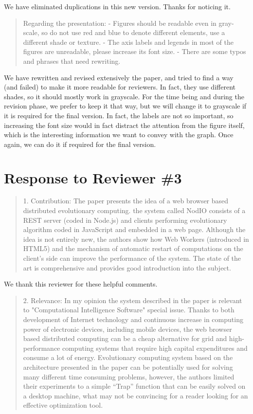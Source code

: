 \documentclass[preprint]{elsarticle}
\begin{document}
We have eliminated duplications in this new version. Thanks for
noticing it.

\begin{quote}
Regarding the presentation:
-  Figures should be readable even in gray-scale, so do not use red and blue to denote different
elements, use a different shade or texture.
-  The axis labels and legends in most of the figures are unreadable, please increase its font size.
-  There are some typos and phrases that need rewriting.
\end{quote}

We have rewritten and revised extensively the paper, and tried to find
a way (and failed) to make it more readable for reviewers. In fact,
they use different shades, so it should mostly work in grayscale. For
the time being and 
during the revision phase, we prefer to keep it that way, but we will
change it to grayscale if it is required for the final version. 
In fact, the labels are not so important, so increasing the font size
would in fact distract the attention from the figure itself, which is
the interesting information we want to convey with the graph. Once
again, we can do it if required for the final version.

\section{Response to Reviewer \#3}

\begin{quote}
1. Contribution: The paper presents the idea of a web browser based distributed evolutionary computing.
the system called NodIO consists of a REST server (coded in Node.js) and clients performing
evolutionary algorithm coded in JavaScript and embedded in a web page. Although the idea is not
entirely new, the authors show how Web Workers (introduced in HTML5) and the mechanism of
automatic restart of computations on the client's side can improve the performance of the system. The
state of the art is comprehensive and provides good introduction into the subject.
\end{quote}

We thank this reviewer for these helpful comments.

\begin{quote}
2. Relevance: In my opinion the system described in the paper is relevant to "Computational Intelligence
Software" special issue. Thanks to both development of Internet technology and continuous increase in
computing power of electronic devices, including mobile devices, the web browser based distributed
computing can be a cheap alternative for grid and high-performance computing systems that require
high capital expenditures and consume a lot of energy. Evolutionary computing system based on the
architecture presented in the paper can be potentially used for solving many different time consuming
problems, however, the authors limited their experiments to a simple ``Trap'' function that can be easily
solved on a desktop machine, what may not be convincing for a reader looking for an effective
optimization tool.
\end{quote}
\end{document}

